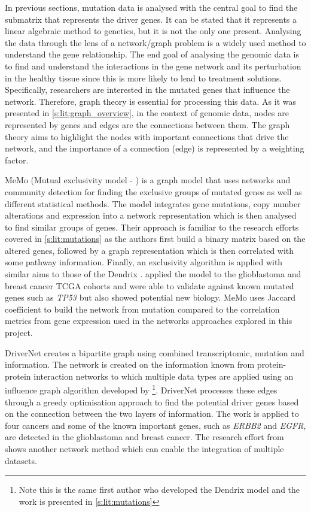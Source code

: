 In previous sections, mutation data is analysed with the central goal to find the submatrix that represents the driver genes. It can be stated that it represents a linear algebraic method to genetics, but it is not the only one present. Analysing the data through the lens of a network/graph problem is a widely used method to understand the gene relationship. The end goal of analysing the genomic data is to find and understand the interactions in the gene network and its perturbation in the healthy tissue since this is more likely to lead to treatment solutions. Specifically, researchers are interested in the mutated genes that influence the network. Therefore, graph theory is essential for processing this data. As it was presented in \cref{s:lit:graph_overview}, in the context of genomic data, nodes are represented by genes and edges are the connections between them. The graph theory aims to highlight the nodes with important connections that drive the network, and the importance of a connection (edge) is represented by a weighting factor.

MeMo (Mutual exclusivity model - \cite{Ciriello2012-hi}) is a graph model that uses networks and community detection for finding the exclusive groups of mutated genes as well as different statistical methods. The model integrates gene mutations, copy number alterations and expression into a network representation which is then analysed to find similar groups of genes. Their approach is familiar to the research efforts covered in \cref{s:lit:mutations} as the authors first build a binary matrix based on the altered genes, followed by a graph representation which is then correlated with some pathway information. Finally, an exclusivity algorithm is applied with similar aims to those of the Dendrix \citep{Vandin2012-cf}. \citet{Ciriello2012-hi} applied the model to the glioblastoma and breast cancer TCGA cohorts and were able to validate against known mutated genes such as \textit{TP53} but also showed potential new biology. MeMo uses Jaccard coefficient to build the network from mutation compared to the correlation metrics from gene expression used in the networks approaches explored in this project. 

DriverNet  \citep{Bashashati2012-lk} creates a bipartite graph using combined transcriptomic, mutation and information. The network is created on the information known from protein-protein interaction networks to which multiple data types are applied using an influence graph algorithm developed by \citet{Vandin2011-bs}\footnote{Note this is the same first author who developed the Dendrix model and the work is presented in \cref{s:lit:mutations}}. DriverNet processes these edges through a greedy optimisation approach to find the potential driver genes based on the connection between the two layers of information. The work is applied to four cancers and some of the known important genes, such as \textit{ERBB2} and \textit{EGFR}, are detected in the glioblastoma and breast cancer. The research effort from \citet{Bashashati2012-lk} shows another network method which can enable the integration of multiple datasets.

